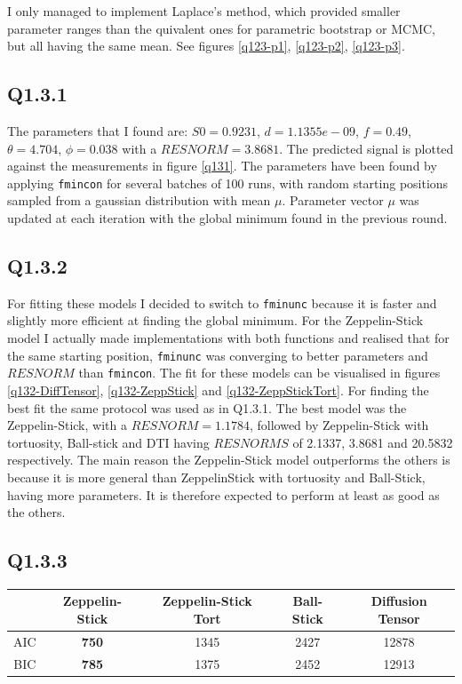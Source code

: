 \documentclass[11pt,a4paper,oneside]{report}
\begin{document}
I only managed to implement Laplace's method, which provided smaller parameter ranges than the quivalent ones for parametric bootstrap or MCMC, but all having the same mean. See figures \ref{q123-p1}, \ref{q123-p2}, \ref{q123-p3}.

\subsection*{Q1.3.1}

The parameters that I found are: $S0=0.9231$, $d=1.1355e-09$, $f=0.49$, $\theta=4.704$, $\phi=0.038$ with a $RESNORM=3.8681$. The predicted signal is plotted against the measurements in figure \ref{q131}. The parameters have been found by applying \texttt{fmincon} for several batches of 100 runs, with random starting positions sampled from a gaussian distribution with mean $\mu$. Parameter vector $\mu$ was updated at each iteration with the global minimum found in the previous round.

\subsection*{Q1.3.2}
For fitting these models I decided to switch to \texttt{fminunc} because it is faster and slightly more efficient at finding the global minimum. For the Zeppelin-Stick model I actually made implementations with both functions and realised that for the same starting position, \texttt{fminunc} was converging to better parameters and $RESNORM$ than \texttt{fmincon}. The fit for these models can be visualised in figures \ref{q132-DiffTensor}, \ref{q132-ZeppStick} and \ref{q132-ZeppStickTort}. For finding the best fit the same protocol was used as in Q1.3.1. The best model was the Zeppelin-Stick, with a $RESNORM=1.1784$, followed by Zeppelin-Stick with tortuosity, Ball-stick and DTI having $RESNORMS$ of 2.1337, 3.8681 and 20.5832 respectively. The main reason the Zeppelin-Stick model outperforms the others is because it is more general than ZeppelinStick with tortuosity and Ball-Stick, having more parameters. It is therefore expected to perform at least as good as the others.



\subsection*{Q1.3.3}

\begin{center}
\begin{tabular}{c | c | c | c | c}
& \textbf{Zeppelin-Stick} & Zeppelin-Stick Tort & Ball-Stick & Diffusion Tensor\\
\hline
AIC & \textbf{750} & 1345 & 2427 & 12878\\
BIC & \textbf{785} & 1375 & 2452 & 12913\\
\end{tabular}
\end{center}
\end{document}
